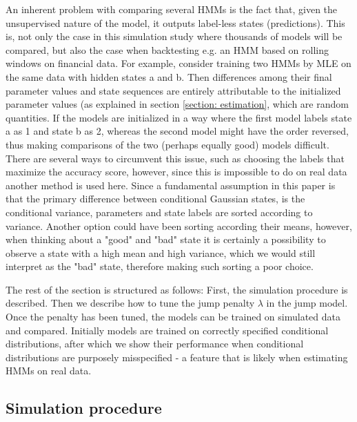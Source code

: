 An inherent problem with comparing several HMMs is the fact that, given the unsupervised nature of the model, it outputs label-less states (predictions). This is, not only the case in this simulation study where thousands of models will be compared, but also the case when backtesting e.g. an HMM based on rolling windows on financial data. For example, consider training two HMMs by MLE on the same data with hidden states a and b. Then differences among their final parameter values and state sequences are entirely attributable to the initialized parameter values (as explained in section \ref{section: estimation}, which are random quantities. If the models are initialized in a way where the first model labels state a as 1 and state b as 2, whereas the second model might have the order reversed, thus making comparisons of the two (perhaps equally good) models difficult. There are several ways to circumvent this issue, such as choosing the labels that maximize the accuracy score, however, since this is impossible to do on real data another method is used here. Since a fundamental assumption in this paper is that the primary difference between conditional Gaussian states, is the conditional variance, parameters and state labels are sorted according to variance. Another option could have been sorting according their means, however, when thinking about a "good" and "bad" state it is certainly a possibility to observe a state with a high mean and high variance, which we would still interpret as the "bad" state, therefore making such sorting a poor choice.

The rest of the section is structured as follows: First, the simulation procedure is described. Then we describe how to tune the jump penalty $\lambda$ in the jump model. Once the penalty has been tuned, the models can be trained on simulated data and compared. Initially models are trained on correctly specified conditional distributions, after which we show their performance when conditional distributions are purposely misspecified - a feature that is likely when estimating HMMs on real data.

\subsection{Simulation procedure}

